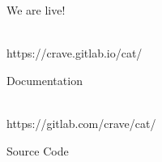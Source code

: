 \documentclass[10pt,aspectratio=169,table,usenames,dvipsnames,table]{beamer}
\begin{document}
\begin{frame}{We are live!}
  \begin{minipage}{0.5\textwidth}
  \begin{center}
    \\[1em]
    https://crave.gitlab.io/cat/

    Documentation
  \end{center}
  \end{minipage}%
  \begin{minipage}{0.5\textwidth}
  \begin{center}
    \\[1em]
    https://gitlab.com/crave/cat/

    Source Code
  \end{center}
\end{minipage}
\end{frame}
\end{document}
